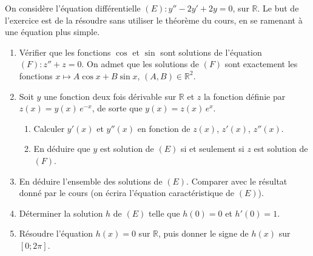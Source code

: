 \begin{exo}
\label{exo:ed changement inconnue}
On consid\`ere l'\'equation diff\'erentielle $(E) : y'' - 2y' + 2y = 0$, sur $\mathbb{R}$.
Le but de l'exercice est de la r\'esoudre sans utiliser le th\'eor\`eme du cours, en se ramenant \`a une \'equation plus simple.
\begin{enumerate}
\item V\'erifier que les fonctions $\cos$ et $\sin$ sont solutions de l'\'equation $(F) : z'' + z = 0$.
      On admet que les solutions de $(F)$ sont exactement les fonctions $x \mapsto A \cos x + B \sin x$, $(A , B) \in \mathbb{R}^2$.
\item Soit $y$ une fonction deux fois d\'erivable sur $\mathbb{R}$ et $z$ la fonction d\'efinie par $z(x) = y(x)\, e^{-x}$,
      de sorte que $y(x) = z(x)\, e^{x}$.
      \begin{enumerate}
      \item Calculer $y'(x)$ et $y''(x)$ en fonction de $z(x)$, $z'(x)$, $z''(x)$.
      \item En d\'eduire que $y$ est solution de $(E)$ si et seulement si $z$ est solution de $(F)$.
      \end{enumerate}
\item En d\'eduire l'ensemble des solutions de $(E)$. Comparer avec le r\'esultat donn\'e par le cours
      (on \'ecrira l'\'equation caract\'eristique de $(E)$).
\item D\'eterminer la solution $h$ de $(E)$ telle que $h(0) = 0$ et $h'(0) = 1$.
\item R\'esoudre l'\'equation $h(x) = 0$ sur $\mathbb{R}$, puis donner le signe de $h(x)$ sur $[0 ; 2\pi]$.
\end{enumerate}
\end{exo}

